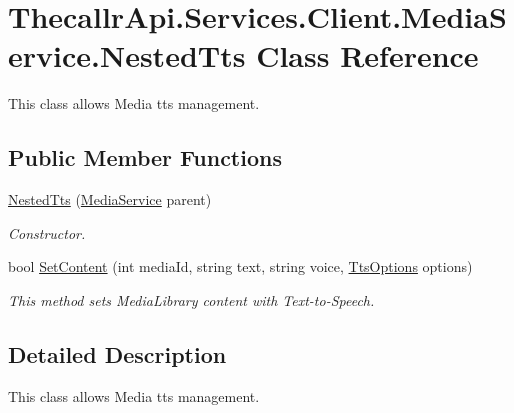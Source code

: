 \hypertarget{class_thecallr_api_1_1_services_1_1_client_1_1_media_service_1_1_nested_tts}{\section{Thecallr\+Api.\+Services.\+Client.\+Media\+Service.\+Nested\+Tts Class Reference}
\label{class_thecallr_api_1_1_services_1_1_client_1_1_media_service_1_1_nested_tts}
}


This class allows Media tts management.  


\subsection*{Public Member Functions}
\begin{DoxyCompactItemize}
\item 
\hyperlink{class_thecallr_api_1_1_services_1_1_client_1_1_media_service_1_1_nested_tts_aade3b9f883d2d39c3eb79892b2384719}{Nested\+Tts} (\hyperlink{class_thecallr_api_1_1_services_1_1_client_1_1_media_service}{Media\+Service} parent)
\begin{DoxyCompactList}\small\item\em Constructor. \end{DoxyCompactList}\item 
bool \hyperlink{class_thecallr_api_1_1_services_1_1_client_1_1_media_service_1_1_nested_tts_ab82434078f5ce52c675dc95711203407}{Set\+Content} (int media\+Id, string text, string voice, \hyperlink{class_thecallr_api_1_1_objects_1_1_media_1_1_tts_options}{Tts\+Options} options)
\begin{DoxyCompactList}\small\item\em This method sets Media\+Library content with Text-\/to-\/\+Speech. \end{DoxyCompactList}\end{DoxyCompactItemize}


\subsection{Detailed Description}
This class allows Media tts management. 



